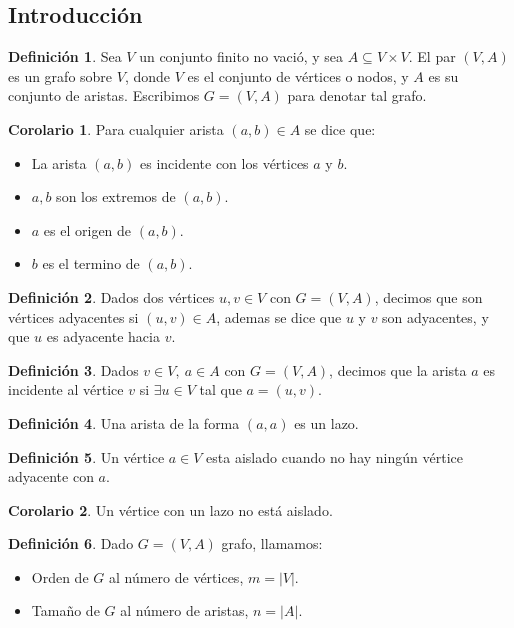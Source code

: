 \documentclass[10pt]{article}
\theoremstyle{definition}
\newtheorem{definition}{Definición}[section]
\newtheorem{corollary}{Corolario}[theorem]
\begin{document}
\subsection{Introducción}
\begin{definition}
	Sea $V$ un conjunto finito no vació, y sea $A\subseteq V\times V$. El par $(V,A)$ es un grafo sobre $V$, donde $V$ es el conjunto de vértices o nodos, y $A$ es su conjunto de aristas. Escribimos $G=(V,A)$ para denotar tal grafo.
\end{definition}
\begin{corollary}
	Para cualquier arista $(a,b)\in A$ se dice que:
	\begin{itemize}
		\item La arista $(a,b)$ es incidente con los vértices $a$ y $b$.
		\item $a,b$ son los extremos de $(a,b)$.
		\item $a$ es el origen de $(a,b)$.
		\item $b$ es el termino de $(a,b)$.
	\end{itemize}
\end{corollary}
\begin{definition}
	Dados dos vértices $u,v\in V$ con $G=(V,A)$, decimos que son vértices adyacentes si $(u,v)\in A$, ademas se dice que $u$ y $v$ son adyacentes, y que $u$ es adyacente hacia $v$.
\end{definition}
\begin{definition}
	Dados $v\in V,\ a\in A$ con $G=(V,A)$, decimos que la arista $a$ es incidente al vértice $v$ si $\exists u\in V$ tal que $a=(u,v)$.
\end{definition}
\begin{definition}
	Una arista de la forma $(a,a)$ es un lazo.
\end{definition}
\begin{definition}
	Un vértice $a\in V$ esta aislado cuando no hay ningún vértice adyacente con $a$.
\end{definition}
\begin{corollary}
	Un vértice con un lazo no está aislado.
\end{corollary}
\begin{definition}
	Dado $G=(V,A)$ grafo, llamamos:
	\begin{itemize}
		\item Orden de $G$ al número de vértices, $m=|V|$.
		\item Tamaño de $G$ al número de aristas, $n=|A|$.
	\end{itemize}
\end{definition}
\end{document}
